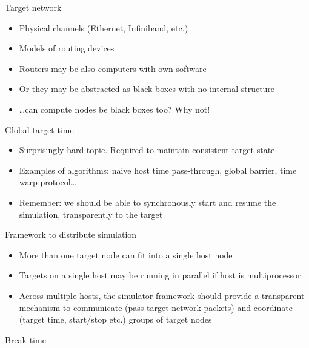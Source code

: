 \begin{frame}{Target network}

\begin{itemize}
\item Physical channels (Ethernet, Infiniband, etc.)
\item Models of routing devices
\item Routers may be also computers with own software
\item Or they may be abstracted as black boxes with no internal structure \pause
\item …can compute nodes be black boxes too‽ Why not!
\end{itemize}

\end{frame}


\begin{frame}{Global target time}

\begin{itemize}
\item Surprisingly hard topic. Required to maintain consistent target state 
\item Examples of algorithms: naive host time pass-through, global barrier, time warp protocol… 
\item Remember: we should be able to synchronously start and resume the simulation, transparently to the target
\end{itemize}

\end{frame}

\begin{frame}{Framework to distribute simulation}

\begin{itemize}
\item More than one target node can fit into a single host node
\item Targets on a single host may be running in parallel if host is multiprocessor
\item Across multiple hosts, the simulator framework should provide a transparent mechanism to communicate (pass target network packets) and coordinate (target time, start/stop etc.) groups of target nodes
\end{itemize}

\end{frame}

\begin{frame}{Break time}
\end{frame}


